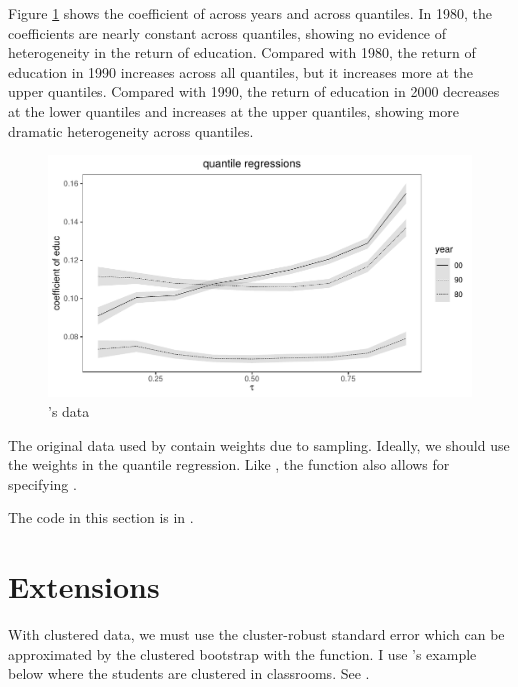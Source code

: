 Figure \ref{fig::angrist-regression-quantiles} shows the coefficient of  across years and across quantiles. In 1980, the coefficients are nearly constant across quantiles, showing no evidence of heterogeneity in the return of education. Compared with 1980, the return of education in 1990 increases across all quantiles, but it increases more at the upper quantiles. Compared with 1990, the return of education in 2000 decreases at the lower quantiles and increases at the upper quantiles, showing more dramatic heterogeneity across quantiles. 

 
\begin{figure}[th]
\centering
\includegraphics[width = \textwidth]{figures/angrist_qr.pdf}
\caption{\citet{angrist2006quantile}'s data}\label{fig::angrist-regression-quantiles}
\end{figure}



The original data used by \citet{angrist2006quantile} contain weights due to sampling. Ideally, we should use the weights in the quantile regression. Like , the  function also allows for specifying .

The  code in this section is in . 




\section{Extensions}


With clustered data, we must use the cluster-robust standard error which can be approximated by the clustered bootstrap with the  function. I use \citet{hagemann2017cluster}'s example below where the students are clustered in classrooms. See . 

